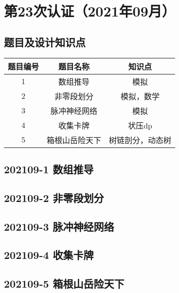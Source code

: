 \documentclass[cn,10pt,math=newtx,citestyle=gb7714-2015,bibstyle=gb7714-2015]{elegantbook}
\newif\ifonlyanalyze %
\begin{document}
\chapter{第23次认证（2021年09月）}

\section{题目及设计知识点}

\begin{table}[htbp]
  \centering
  \begin{tabular}{ccc}
    \toprule
    题目编号 & 题目名称 & 知识点\\
    \midrule
    1 & 数组推导 & 模拟 \\
    2 & 非零段划分 & 模拟，数学 \\
    3 & 脉冲神经网络 & 模拟 \\
    4 & 收集卡牌 & 状压dp \\
    5 & 箱根山岳险天下 & 树链剖分，动态树 \\
    \bottomrule
  \end{tabular}
\end{table}

\newpage
\section{202109-1 数组推导}
\ifonlyanalyze
\else

\fi


\newpage
\section{202109-2 非零段划分}
\ifonlyanalyze
\else

\fi


\newpage
\section{202109-3 脉冲神经网络}
\ifonlyanalyze
\else

\fi


\newpage
\section{202109-4 收集卡牌}
\ifonlyanalyze
\else

\fi


\newpage
\section{202109-5 箱根山岳险天下}
\ifonlyanalyze
\else

\fi

\end{document}

